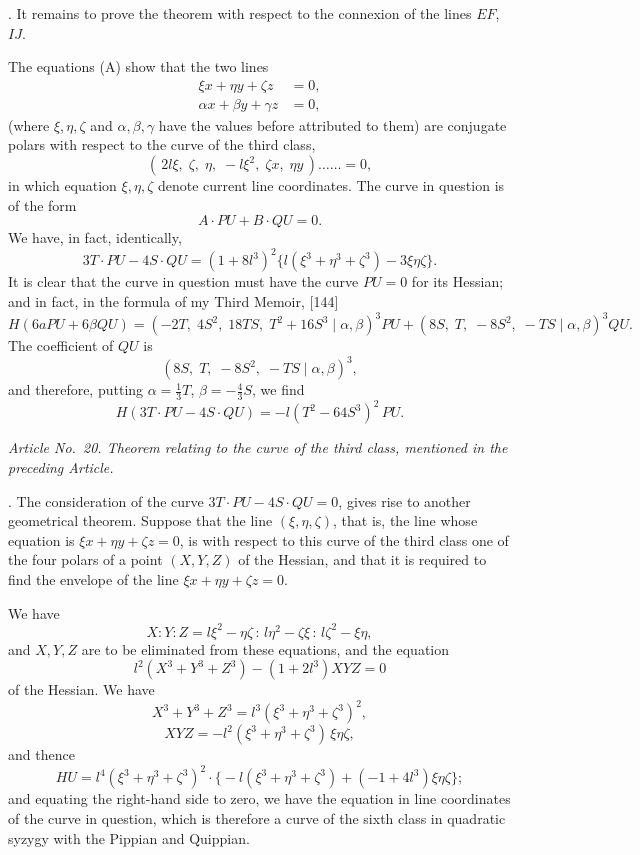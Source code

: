 \documentclass[11pt]{article}
\begin{document}
\medskip

. It remains to prove the theorem with respect to the connexion of the lines $EF$, $IJ$.

The equations (A) show that the two lines
\begin{align*}
\xi x + \eta y + \zeta z &= 0, \\
\alpha x + \beta y + \gamma z &= 0,
\end{align*}
(where $\xi, \eta, \zeta$ and $\alpha, \beta, \gamma$ have the values before attributed to them) are conjugate polars with respect to the curve of the third class,
\[
(\,2 l\xi,\; \zeta,\; \eta,\; -l\xi^2,\; \zeta x,\; \eta y\,)\ldots\ldots = 0,
\]
in which equation $\xi, \eta, \zeta$ denote current line coordinates. The curve in question is of the form
\[
A \cdot PU + B \cdot QU = 0.
\]
We have, in fact, identically,
\[
3 T \cdot PU - 4 S \cdot QU = (1 + 8 l^3)^2 \bigl\{ l(\xi^3 + \eta^3 + \zeta^3) - 3\xi\eta\zeta \bigr\}.
\]
It is clear that the curve in question must have the curve $PU = 0$ for its Hessian; and in fact, in the formula of my Third Memoir, [144]
\[
H(6 a PU + 6 \beta QU) = (-2 T,\; 4 S^2,\; 18 T S,\; T^2 + 16 S^3 \mid \alpha, \beta)^3 PU + (8 S,\; T,\; -8 S^2,\; -TS \mid \alpha, \beta)^3 QU.
\]
The coefficient of $QU$ is
\[
(8 S,\; T,\; -8 S^2,\; -TS \mid \alpha, \beta)^3,
\]
and therefore, putting $\alpha = \tfrac{1}{3} T$, $\beta = -\tfrac{4}{3} S$, we find
\[
H(3 T \cdot PU - 4 S \cdot QU) = -l(T^2 - 64 S^3)^2\, PU.
\]

\medskip

\textit{Article No.~20. Theorem relating to the curve of the third class, mentioned in the preceding Article.}

\medskip

. The consideration of the curve $3 T \cdot PU - 4 S \cdot QU = 0$, gives rise to another geometrical theorem. Suppose that the line $(\xi, \eta, \zeta)$, that is, the line whose equation is $\xi x + \eta y + \zeta z = 0$, is with respect to this curve of the third class one of the four polars of a point $(X, Y, Z)$ of the Hessian, and that it is required to find the envelope of the line $\xi x + \eta y + \zeta z = 0$.

We have
\[
X : Y : Z = l\xi^2 - \eta\zeta \,:\, l\eta^2 - \zeta\xi \,:\, l\zeta^2 - \xi\eta,
\]
and $X, Y, Z$ are to be eliminated from these equations, and the equation
\[
l^2 (X^3 + Y^3 + Z^3) - (1 + 2 l^3) X Y Z = 0
\]
of the Hessian. We have
\[
X^3 + Y^3 + Z^3 = l^3 (\xi^3 + \eta^3 + \zeta^3)^2,
\]
\[
X Y Z = -l^2 (\xi^3 + \eta^3 + \zeta^3)\,\xi\eta\zeta,
\]
and thence
\[
HU = l^4 (\xi^3 + \eta^3 + \zeta^3)^2 \cdot \bigl\{-l(\xi^3+\eta^3+\zeta^3) + (-1 + 4 l^3)\xi\eta\zeta\bigr\};
\]
and equating the right-hand side to zero, we have the equation in line coordinates of the curve in question, which is therefore a curve of the sixth class in quadratic syzygy with the Pippian and Quippian.
\end{document}
